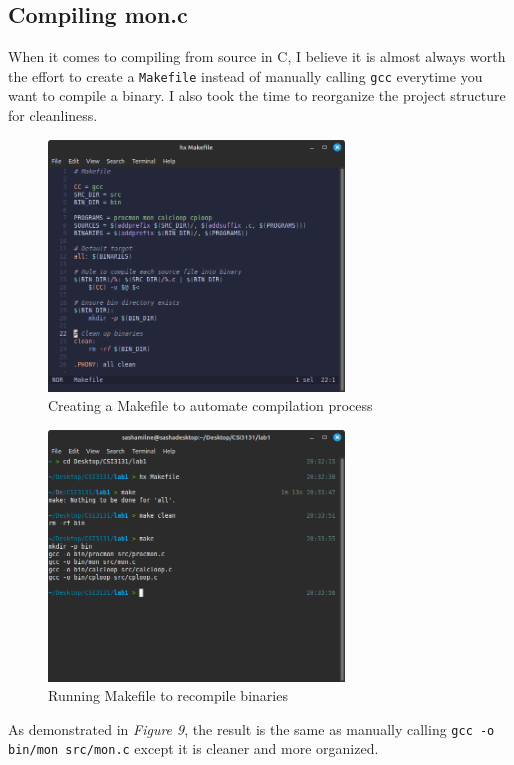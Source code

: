 \subsection{Compiling mon.c}\label{subsec:compiling-mon.c}
When it comes to compiling from source in C, I believe it is almost
always worth the effort to create a \texttt{Makefile}
instead of manually calling \texttt{gcc} everytime you want to compile a binary.
I also took the time to reorganize the project structure for cleanliness.

\begin{figure}[H]
    \centering
    \includegraphics[width=0.7\textwidth]{../../screenshots/step10-makefile}
    \caption{Creating a Makefile to automate compilation process}
    \label{fig:step10-makefile}
\end{figure}

\begin{figure}[H]
    \centering
    \includegraphics[width=0.7\textwidth]{../../screenshots/step10-compiling}
    \caption{Running Makefile to recompile binaries}
    \label{fig:step10-compiling}
\end{figure}

\noindent
As demonstrated in \textit{Figure 9}, the result is the same as manually
calling \texttt{gcc -o bin/mon src/mon.c} except it is cleaner and more
organized.

